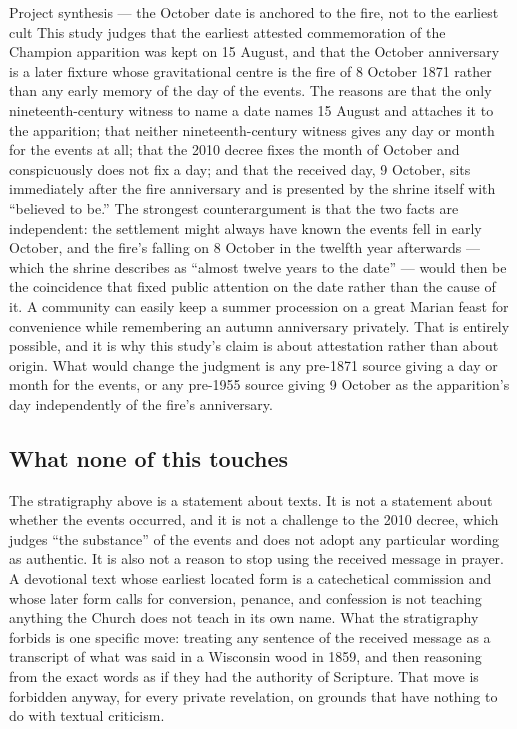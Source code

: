 \begin{judgmentbox}{Project synthesis --- the October date is anchored
to the fire, not to the earliest cult}
This study judges that the earliest attested commemoration of the
Champion apparition was kept on 15 August, and that the October
anniversary is a later fixture whose gravitational centre is the fire
of 8 October 1871 rather than any early memory of the day of the
events. The reasons are that the only nineteenth-century witness to
name a date names 15 August and attaches it to the apparition; that
neither nineteenth-century witness gives any day or month for the
events at all; that the 2010 decree fixes the month of October and
conspicuously does not fix a day; and that the received day, 9 October,
sits immediately after the fire anniversary and is presented by the
shrine itself with ``believed to be.''\jsep
The strongest counterargument is that the two facts are independent:
the settlement might always have known the events fell in early
October, and the fire's falling on 8 October in the twelfth year
afterwards --- which the shrine describes as ``almost twelve years to
the date'' --- would then be the coincidence that fixed public
attention on the date rather than the cause of it. A community can
easily keep a summer procession on a great Marian feast for
convenience while remembering an autumn anniversary privately. That is
entirely possible, and it is why this study's claim is about
attestation rather than about origin.\jsep
What would change the judgment is any pre-1871 source giving a day or
month for the events, or any pre-1955 source giving 9 October as the
apparition's day independently of the fire's anniversary.
\end{judgmentbox}

\subsection{What none of this touches}

The stratigraphy above is a statement about texts. It is not a
statement about whether the events occurred, and it is not a challenge
to the 2010 decree, which judges ``the substance'' of the events and
does not adopt any particular wording as authentic. It is also not a
reason to stop using the received message in prayer. A devotional text
whose earliest located form is a catechetical commission and whose
later form calls for conversion, penance, and confession is not
teaching anything the Church does not teach in its own name. What the
stratigraphy forbids is one specific move: treating any sentence of the
received message as a transcript of what was said in a Wisconsin wood
in 1859, and then reasoning from the exact words as if they had the
authority of Scripture. That move is forbidden anyway, for every
private revelation, on grounds that have nothing to do with textual
criticism.
